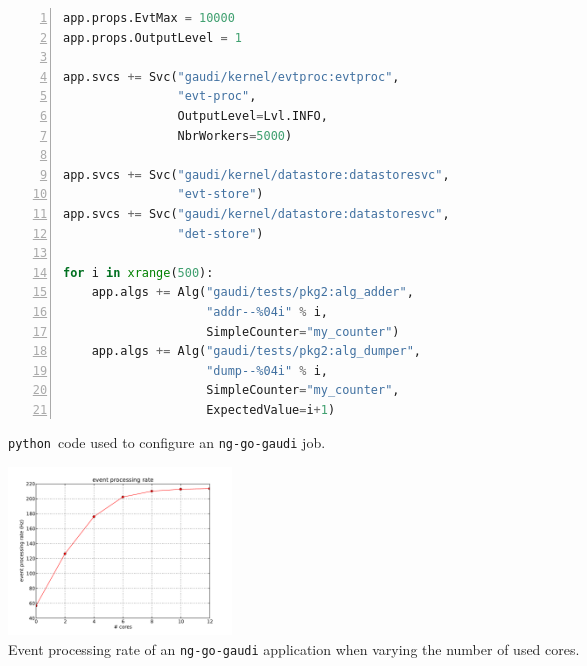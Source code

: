 \documentclass[a4paper]{jpconf}
\newcommand{\python}{\texttt{python}}
\begin{document}
\begin{figure}[h]
\begin{center}
  \begin{minipage}{20pc}
\begin{lstlisting}[language=python,
    basicstyle=\tiny,
    frame=trbl,
    numbers=left,
    showstringspaces=false,
    stringstyle=\ttfamily]
app.props.EvtMax = 10000
app.props.OutputLevel = 1

app.svcs += Svc("gaudi/kernel/evtproc:evtproc",
                "evt-proc",
                OutputLevel=Lvl.INFO,
                NbrWorkers=5000)

app.svcs += Svc("gaudi/kernel/datastore:datastoresvc", 
                "evt-store")
app.svcs += Svc("gaudi/kernel/datastore:datastoresvc", 
                "det-store")

for i in xrange(500):
    app.algs += Alg("gaudi/tests/pkg2:alg_adder",
                    "addr--%04i" % i,
                    SimpleCounter="my_counter")
    app.algs += Alg("gaudi/tests/pkg2:alg_dumper",
                    "dump--%04i" % i,
                    SimpleCounter="my_counter",
                    ExpectedValue=i+1)
\end{lstlisting}
    \caption{\label{fig-go-jobo}\python\ code used to configure an
      \texttt{ng-go-gaudi} job.}
  \end{minipage}\hspace{2pc}%
  \begin{minipage}{15pc}
    \includegraphics[width=14pc]{figs/perfs.pdf}
    \caption{\label{fig-go-perfs}Event processing rate of an
      \texttt{ng-go-gaudi} application when varying the number of used
      cores.}
  \end{minipage} 
\end{center}
\end{figure}
\end{document}
